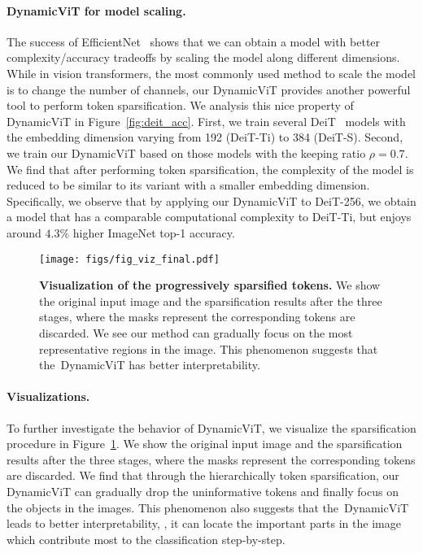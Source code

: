 \documentclass{article}
\newcommand{\dynamvit}{DynamicViT}
\begin{document}
\paragraph{\dynamvit{} for model scaling.} The success of EfficientNet~\cite{tan2019efficientnet} shows that we can obtain a model with better complexity/accuracy tradeoffs by scaling the model along different dimensions. While in vision transformers, the most commonly used method to scale the model is to change the number of channels, our \dynamvit{} provides another powerful tool to perform token sparsification. We analysis this nice property of \dynamvit{} in Figure~\ref{fig:deit_acc}. First, we train several DeiT~\cite{touvron2020deit} models with the embedding dimension varying from 192 (DeiT-Ti) to 384 (DeiT-S). Second, we train our \dynamvit{} based on those models with the keeping ratio $\rho=0.7$. We find that after performing token sparsification, the complexity of the model is reduced to be similar to its variant with a smaller embedding dimension. Specifically, we observe that by applying our \dynamvit{} to DeiT-256, we obtain a model that has a comparable computational complexity to DeiT-Ti, but enjoys around $4.3\%$ higher ImageNet top-1 accuracy.

\begin{figure}
    \centering
    \texttt{[image: figs/fig\_viz\_final.pdf]}
    \caption{\textbf{Visualization of the progressively sparsified tokens.}  We show the original input image and the sparsification results after the three stages, where the masks represent the corresponding tokens are discarded. We see our method can gradually focus on the most representative regions in the image.  This phenomenon suggests that the~\dynamvit{} has better interpretability. }
    \label{fig:viz}
\end{figure}

\paragraph{Visualizations.} To further investigate the behavior of \dynamvit{}, we visualize the sparsification procedure in Figure~\ref{fig:viz}. We show the original input image and the sparsification results after the three stages, where the masks represent the corresponding tokens are discarded. We find that through the hierarchically token sparsification, our \dynamvit{} can gradually drop the uninformative tokens and finally focus on the objects in the images. This phenomenon also suggests that the~\dynamvit{} leads to  better interpretability, \ie, it can locate the important parts in the image which contribute most to the classification step-by-step.
\end{document}
